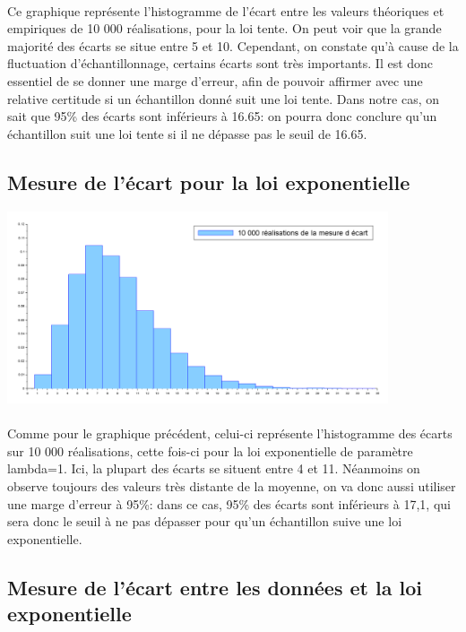 \documentclass{article}
\begin{document}
\paragraph{}
Ce graphique représente l’histogramme de l’écart entre les valeurs théoriques et empiriques de 10 000 réalisations, pour la loi tente.  On peut voir que la grande majorité des écarts se situe entre 5 et 10. Cependant, on constate qu’à cause de  la fluctuation d’échantillonnage, certains écarts sont très importants.  Il est donc essentiel de se donner une marge d’erreur, afin de pouvoir affirmer avec une relative certitude si un échantillon donné suit une loi tente. 
Dans notre cas, on sait que 95\% des écarts sont inférieurs à  16.65: on pourra donc conclure qu’un échantillon suit une loi tente si il ne dépasse pas le seuil de 16.65.


\subsection{Mesure de l'écart pour la loi exponentielle}
\begin{center}
\includegraphics[width=425px]{img/ecart_expo.png}
\end{center}
\paragraph{}
Comme pour le graphique précédent, celui-ci représente l’histogramme des écarts sur 10 000 réalisations, cette fois-ci pour la loi exponentielle de paramètre lambda=1. Ici, la plupart des écarts se situent entre 4 et 11. Néanmoins on observe toujours des valeurs très distante de la moyenne, on va donc aussi utiliser une marge d’erreur à 95\%: dans ce cas, 95\% des écarts sont inférieurs à 17,1, qui sera donc le seuil à ne pas dépasser pour qu’un échantillon suive une loi exponentielle.

\subsection{Mesure de l'écart entre les données et la loi exponentielle}
\end{document}
